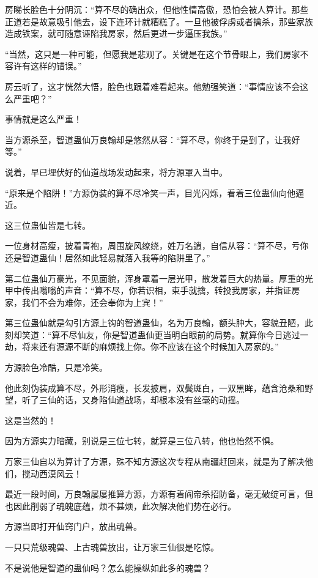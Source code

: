 \begin{this_body}
房睇长脸色十分阴沉：“算不尽的确出众，但他性情高傲，恐怕会被人算计。那些正道若是故意吸引他去，设下连环计就糟糕了。一旦他被俘虏或者擒杀，那些家族造成铁案，就可随意诬陷我房家，然后更进一步逼压我族。”

“当然，这只是一种可能，但愿我是悲观了。关键是在这个节骨眼上，我们房家不容许有这样的错误。”

房云听了，这才恍然大悟，脸色也跟着难看起来。他勉强笑道：“事情应该不会这么严重吧？”

事情就是这么严重！

当方源杀至，智道蛊仙万良翰却是悠然从容：“算不尽，你终于是到了，让我好等。”

说着，早已埋伏好的仙道战场发动起来，将方源罩入当中。

“原来是个陷阱！”方源伪装的算不尽冷笑一声，目光闪烁，看着三位蛊仙向他逼近。

这三位蛊仙皆是七转。

一位身材高瘦，披着青袍，周围旋风缭绕，姓万名逍，自信从容：“算不尽，亏你还是智道蛊仙！居然如此轻易就落入我等的陷阱里了。”

第二位蛊仙万豪光，不见面貌，浑身罩着一层光甲，散发着巨大的热量。厚重的光甲中传出嗡嗡的声音：“算不尽，你若识相，束手就擒，转投我房家，并指证房家，我们不会为难你，还会奉你为上宾！”

第三位蛊仙就是勾引方源上钩的智道蛊仙，名为万良翰，额头肿大，容貌丑陋，此刻却笑道：“算不尽仙友，你是智道蛊仙更当明白眼前的局势。就算你今日逃过一劫，将来还有源源不断的麻烦找上你。你不应该在这个时候加入房家的。”

方源脸色冷酷，只是冷笑。

他此刻伪装成算不尽，外形消瘦，长发披肩，双鬓斑白，一双黑眸，蕴含沧桑和野望，听了三仙的话，又身陷仙道战场，却根本没有丝毫的动摇。

这是当然的！

因为方源实力暗藏，别说是三位七转，就算是三位八转，他也怡然不惧。

万家三仙自以为算计了方源，殊不知方源这次专程从南疆赶回来，就是为了解决他们，搅动西漠风云！

最近一段时间，万良翰屡屡推算方源，方源有着阎帝杀招防备，毫无破绽可言，但也因此削弱了魂魄底蕴，烦不甚烦，此次解决他们势在必行。

方源当即打开仙窍门户，放出魂兽。

一只只荒级魂兽、上古魂兽放出，让万家三仙很是吃惊。

不是说他是智道的蛊仙吗？怎么能操纵如此多的魂兽？


\end{this_body}
